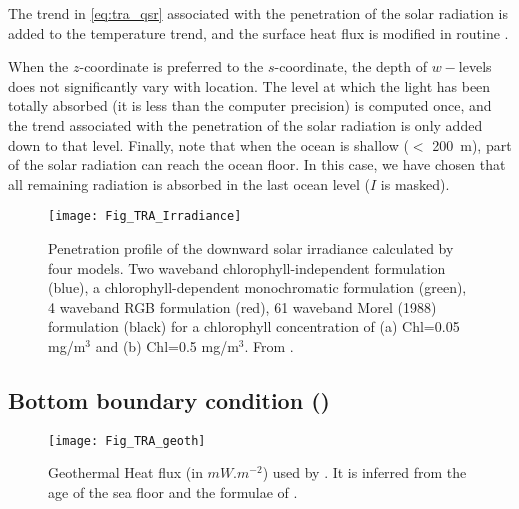 \documentclass[../main/NEMO_manual]{subfiles}
\begin{document}
The trend in \autoref{eq:tra_qsr} associated with the penetration of the solar radiation is added to
the temperature trend, and the surface heat flux is modified in routine .

When the $z$-coordinate is preferred to the $s$-coordinate,
the depth of $w-$levels does not significantly vary with location.
The level at which the light has been totally absorbed
(\ie it is less than the computer precision) is computed once,
and the trend associated with the penetration of the solar radiation is only added down to that level.
Finally, note that when the ocean is shallow ($<$ 200~m), part of the solar radiation can reach the ocean floor.
In this case, we have chosen that all remaining radiation is absorbed in the last ocean level
(\ie $I$ is masked).

\begin{figure}[!t]
  \begin{center}
    \texttt{[image: Fig\_TRA\_Irradiance]}
    \caption{
      \protect\label{fig:traqsr_irradiance}
      Penetration profile of the downward solar irradiance calculated by four models.
      Two waveband chlorophyll-independent formulation (blue),
      a chlorophyll-dependent monochromatic formulation (green),
      4 waveband RGB formulation (red),
      61 waveband Morel (1988) formulation (black) for a chlorophyll concentration of
      (a) Chl=0.05 mg/m$^3$ and (b) Chl=0.5 mg/m$^3$.
      From \citet{Lengaigne_al_CD07}.
    }
  \end{center}
\end{figure}

\subsection{Bottom boundary condition (\protect{})}
\label{subsec:TRA_bbc}

\begin{figure}[!t]
  \begin{center}
    \texttt{[image: Fig\_TRA\_geoth]}
    \caption{
      \protect\label{fig:geothermal}
      Geothermal Heat flux (in $mW.m^{-2}$) used by \cite{Emile-Geay_Madec_OS09}.
      It is inferred from the age of the sea floor and the formulae of \citet{Stein_Stein_Nat92}.
    }
  \end{center}
\end{figure}
\end{document}
